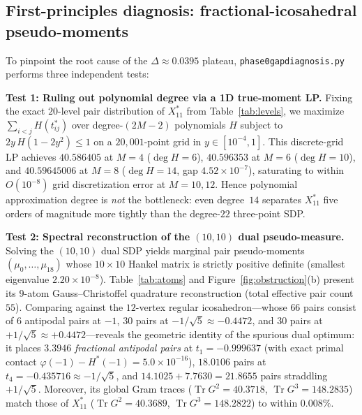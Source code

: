 \documentclass[11pt,reqno]{amsart}
\renewcommand{\_}{\origunderscore\allowbreak}
\renewcommand{\paragraph}[1]{\medskip\noindent\textbf{#1}\enspace}
\theoremstyle{definition}
\newcommand{\Xstar}{X^*_{11}}
\begin{document}
\subsection{First-principles diagnosis: fractional-icosahedral pseudo-moments}\label{subsec:diagnosis}
To pinpoint the root cause of the $\Delta \approx 0.0395$ plateau, \texttt{phase0\_gap\_diagnosis.py} performs three independent tests:

\paragraph{Test 1: Ruling out polynomial degree via a 1D true-moment LP.}
Fixing the exact $20$-level pair distribution of $\Xstar$ from Table~\ref{tab:levels}, we maximize $\sum_{i<j} H(t^*_{ij})$ over degree-$(2M-2)$ polynomials $H$ subject to $2y\,H(1-2y^2) \le 1$ on a $20{,}001$-point grid in $y \in [10^{-4}, 1]$.
This discrete-grid LP achieves $40.586405$ at $M = 4$ ($\deg H = 6$), $40.596353$ at $M = 6$ ($\deg H = 10$), and $40.59645006$ at $M = 8$ ($\deg H = 14$, gap $4.52 \times 10^{-7}$), saturating to within $O(10^{-8})$ grid discretization error at $M = 10, 12$.
Hence polynomial approximation degree is \emph{not} the bottleneck: even degree~$14$ separates $\Xstar$ five orders of magnitude more tightly than the degree-$22$ three-point SDP.

\paragraph{Test 2: Spectral reconstruction of the $(10,10)$ dual pseudo-measure.}
Solving the $(10,10)$ dual SDP yields marginal pair pseudo-moments $(\mu_0, \dots, \mu_{18})$ whose $10 \times 10$ Hankel matrix is strictly positive definite (smallest eigenvalue $2.20 \times 10^{-8}$).
Table~\ref{tab:atoms} and Figure~\ref{fig:obstruction}(b) present its $9$-atom Gauss--Christoffel quadrature reconstruction (total effective pair count $55$).
Comparing against the $12$-vertex regular icosahedron---whose $66$ pairs consist of $6$ antipodal pairs at $-1$, $30$ pairs at $-1/\sqrt{5} \approx -0.4472$, and $30$ pairs at $+1/\sqrt{5} \approx +0.4472$---reveals the geometric identity of the spurious dual optimum: it places $3.3946$ \emph{fractional antipodal pairs} at $t_1 = -0.999637$ (with exact primal contact $\varphi(-1) - H^*(-1) = 5.0 \times 10^{-16}$), $18.0106$ pairs at $t_4 = -0.435716 \approx -1/\sqrt{5}$, and $14.1025 + 7.7630 = 21.8655$ pairs straddling $+1/\sqrt{5}$.
Moreover, its global Gram traces ($\operatorname{Tr} G^2 = 40.3718$, $\operatorname{Tr} G^3 = 148.2835$) match those of $\Xstar$ ($\operatorname{Tr} G^2 = 40.3689$, $\operatorname{Tr} G^3 = 148.2822$) to within $0.008\%$.
\end{document}
